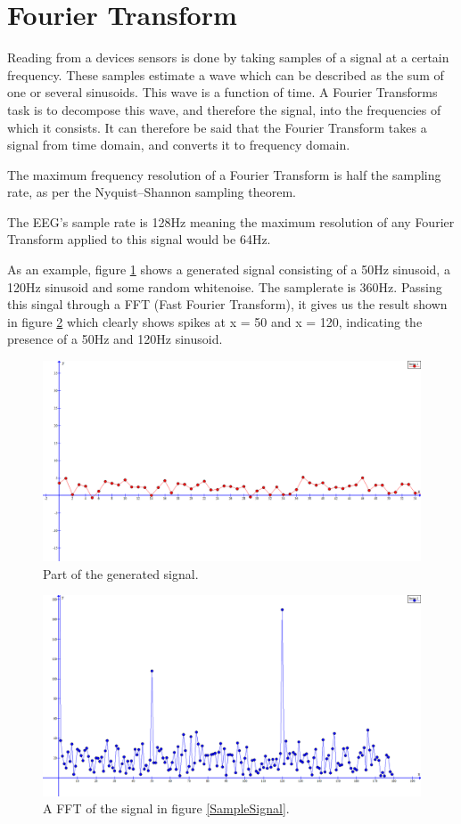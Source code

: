 \section{Fourier Transform}

Reading from a devices sensors is done by taking samples of a signal at a certain frequency.
These samples estimate a wave which can be described as the sum of one or several sinusoids.
This wave is a function of time.
A Fourier Transforms task is to decompose this wave, and therefore the signal, into the frequencies of which it consists.
It can therefore be said that the Fourier Transform takes a signal from time domain, and converts it to frequency domain.

The maximum frequency resolution of a Fourier Transform is half the sampling rate, as per the Nyquist–Shannon sampling theorem.\cite{Digital_Signalbehandling}

The EEG's sample rate is 128Hz meaning the maximum resolution of any Fourier Transform applied to this signal would be 64Hz.

As an example, figure \ref{[FFT] Sample Signal} shows a generated signal consisting of a 50Hz sinusoid, a 120Hz sinusoid and some random whitenoise. The samplerate is 360Hz.
Passing this singal through a FFT (Fast Fourier Transform), it gives us the result shown in figure \ref{[FFT] Sample Result} which clearly shows spikes at x = 50 and x = 120, indicating the presence of a 50Hz and 120Hz sinusoid. 

\begin{figure}[h!]
  \centering
    \includegraphics[width=1\textwidth]{sections/analysis/FFT/SampleCutout}
  \caption{Part of the generated signal.}
  \label{[FFT] Sample Signal}
\end{figure}

\begin{figure}[h!]
  \centering
    \includegraphics[width=1\textwidth]{sections/analysis/FFT/FFTResult}
  \caption{A FFT of the signal in figure \ref{SampleSignal}.}
  \label{[FFT] Sample Result}
\end{figure}
